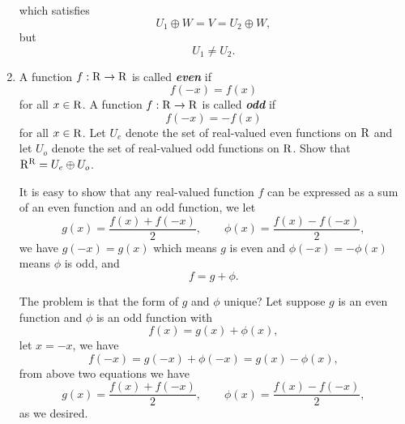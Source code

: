 \begin{enumerate}
\begin{solution}
            which satisfies
            \[ U_1 \oplus W = V = U_2 \oplus W,\]
            but 
            \[ U_1 \neq U_2.\]
        \end{solution}
    \item A function $f:\mathrm{R} \to \mathrm{R}$ is called \textbf{\textit{even}} if 
        \[ f(-x) = f(x) \]
        for all $x \in \mathrm{R}$. A function $f: \mathrm{R} \to \mathrm{R}$ is called \textbf{\textit{odd}} if 
        \[ f(-x) = -f(x) \]
        for all $x \in \mathrm{R}$. Let $U_e$ denote the set of real-valued even functions on $\mathrm{R}$
        and let $U_o$ denote the set of real-valued odd functions on $\mathrm{R}$. Show that $\mathrm{R}^{\mathrm{R}}=U_e \oplus U_o$.
        \begin{solution}
            It is easy to show that any real-valued function $f$ can be expressed as a sum of 
            an even function and an odd function, we let 
            \[ g(x) = \dfrac{f(x)+f(-x)}{2}, \qquad \phi(x) = \dfrac{f(x)-f(-x)}{2},\]
            we have $g(-x) = g(x)$ which means $g$ is even and $\phi(-x)=-\phi(x)$ means $\phi$ is odd, and 
            \[ f = g + \phi .\]

            The problem is that the form of $g$ and $\phi$ unique? Let suppose $g$ is an even function and $\phi$ is an odd function 
            with 
            \[ f(x) = g(x) + \phi(x) ,\]
            let $x = -x$, we have 
            \[ f(-x) = g(-x) + \phi(-x) = g(x) - \phi(x) ,\]
            from above two equations we have 
            \[ g(x) = \dfrac{f(x)+f(-x)}{2}, \qquad \phi(x) = \dfrac{f(x)-f(-x)}{2},\]
            as we desired.
        \end{solution}
\end{enumerate}